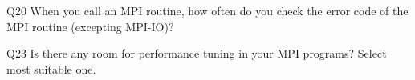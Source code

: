 \begin{description}%
\item{Q20} When you call an MPI routine, how often do you check the error code of the MPI routine  (excepting MPI-IO)?%
\item{Q23} Is there any room for performance tuning in your MPI programs? Select most suitable one.%
\end{description}%
